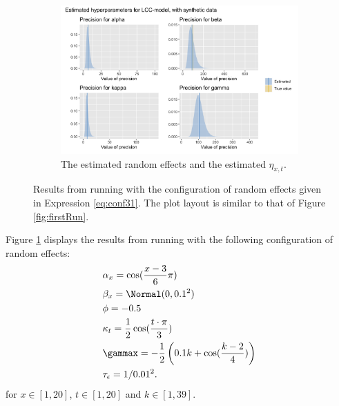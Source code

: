 \begin{figure}[h!]
    \begin{subfigure}[b]{0.6\textwidth}
        \centering
        \includegraphics[width=\textwidth]{synthetic-data/Figures/hyperparameters-LCC-synthetic-3-1.png}
        \caption{The estimated random effects and the estimated $\eta_{x,t}$.}
    \end{subfigure}
    \caption{Results from running \inlabru with the configuration of random effects given in Expression \ref{eq:conf31}. The plot layout is similar to that of Figure \ref{fig:firstRun}.}
    \label{fig:conf31}
\end{figure}

Figure \ref{fig:conf31} displays the results from running \inlabru with the following configuration of random effects:
\begin{equation}
    \begin{aligned}
        &\alpha_x = \cos(\frac{x-3}{6}\pi)\\
        &\beta_x = \Normal(0,0.1^2)\\
        &\phi = -0.5\\
        &\kappa_t = \frac{1}{2}\cos(\frac{t\cdot \pi}{3})\\
        &\gammax = -\frac{1}{2}\left( 0.1k + \cos(\frac{k-2}{4})\right)\\
        &\tau_{\epsilon} = 1/0.01^2.
    \end{aligned}
    \label{eq:conf31}
\end{equation}
for $x\in[1,20]$, $t \in [1,20]$ and $k \in [1,39]$. 

